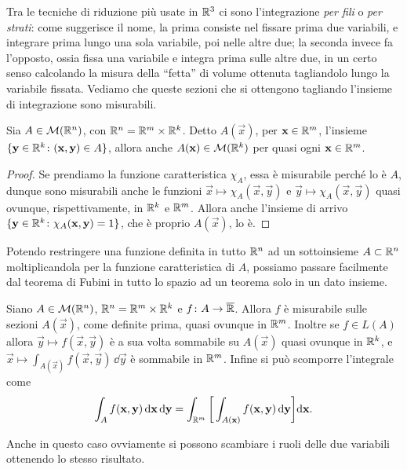 Tra le tecniche di riduzione più usate in $\mathbb{R}^3$ ci sono l'integrazione \emph{per fili} o \emph{per strati}: come suggerisce il nome, la prima consiste nel fissare prima due variabili, e integrare prima lungo una sola variabile, poi nelle altre due; la seconda invece fa l'opposto, ossia fissa una variabile e integra prima sulle altre due, in un certo senso calcolando la misura della ``fetta'' di volume ottenuta tagliandolo lungo la variabile fissata.
Vediamo che queste sezioni che si ottengono tagliando l'insieme di integrazione sono misurabili.
\begin{lemma} \label{l:sezioni-misurabili}
	Sia $A\in\mathcal M(\mathbb{R}^n)$, con $\mathbb{R}^n=\mathbb{R}^m\times\mathbb{R}^k$.
	Detto $A(\vec x)$, per $\mathbf{x}\in\mathbb{R}^m$, l'insieme $\{\mathbf{y}\in\mathbb{R}^k\colon(\mathbf{x},\mathbf{y})\in A\}$, allora anche $A(\mathbf{x})\in\mathcal M(\mathbb{R}^k)$ per quasi ogni $\mathbf{x}\in\mathbb{R}^m$.
\end{lemma}
\begin{proof}
	Se prendiamo la funzione caratteristica $\chi_A$, essa è misurabile perch\'e lo è $A$, dunque sono misurabili anche le funzioni $\vec x\mapsto\chi_A(\vec x,\vec y)$ e $\vec y\mapsto\chi_A(\vec x,\vec y)$ quasi ovunque, rispettivamente, in $\mathbb{R}^k$ e $\mathbb{R}^m$.
	Allora anche l'insieme di arrivo $\{\mathbf{y}\in\mathbb{R}^k\colon\chi_A(\mathbf{x},\mathbf{y})=1\}$, che è proprio $A(\vec x)$, lo è.
\end{proof}
Potendo restringere una funzione definita in tutto $\mathbb{R}^n$ ad un sottoinsieme $A\subset\mathbb{R}^n$ moltiplicandola per la funzione caratteristica di $A$, possiamo passare facilmente dal teorema di Fubini in tutto lo spazio ad un teorema solo in un dato insieme.
\begin{teorema} \label{t:fubini2}
	Siano $A\in\mathcal M(\mathbb{R}^n)$, $\mathbb{R}^n=\mathbb{R}^m\times\mathbb{R}^k$ e $f\colon A\to\overline{\mathbb{R}}$.
	Allora $f$ è misurabile sulle sezioni $A(\vec x)$, come definite prima, quasi ovunque in $\mathbb{R}^m$.
	Inoltre se $f\in L(A)$ allora $\vec y\mapsto f(\vec x,\vec y)$ è a sua volta sommabile su $A(\vec x)$ quasi ovunque in $\mathbb{R}^k$, e $\vec x\mapsto\int_{A(\vec x)}f(\vec x,\vec y)\,\dd\vec y$ è sommabile in $\mathbb{R}^m$.
	Infine si può scomporre l'integrale come
	\begin{equation}
		\int_Af(\mathbf{x},\mathbf{y})\,\textup{d}\mathbf{x}\,\textup{d}\mathbf{y}=\int_{\mathbb{R}^m}\bigg[\int_{A(\mathbf{x})}f(\mathbf{x},\mathbf{y})\,\textup{d}\mathbf{y}\bigg]\textup{d}\mathbf{x}.
	\end{equation}
\end{teorema}
Anche in questo caso ovviamente si possono scambiare i ruoli delle due variabili ottenendo lo stesso risultato.


